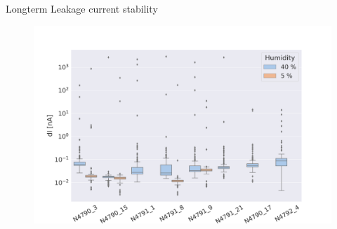 \documentclass{beamer}
\begin{document}
\begin{frame}{Longterm Leakage current stability}
  \begin{figure}
    \includegraphics[width=.8\textwidth]{plots/RangesForCurrentVariationsDryAir.png}
  \end{figure}
  \href{https://indico.cern.ch/event/1121372/contributions/4708329/attachments/2382634/4071804/Longterm_Leakage_Current_Measurements.pdf}{}
\end{frame}
\end{document}
